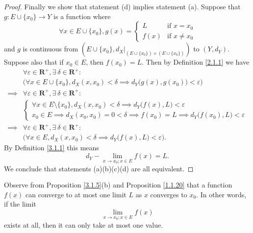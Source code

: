 \begin{proof}
    Finally we show that statement (d) implies statement (a).
    Suppose that \(g : E \cup \{x_0\} \to Y\) is a function where
    \[
        \forall x \in E \cup \{x_0\}, g(x) = \begin{cases}
            L    & \text{if } x = x_0    \\
            f(x) & \text{if } x \neq x_0
        \end{cases}
    \]
    and \(g\) is continuous from \((E \cup \{x_0\}, d_X|_{(E \cup \{x_0\}) \times (E \cup \{x_0\})})\) to \((Y, d_Y)\).
    Suppose also that if \(x_0 \in E\), then \(f(x_0) = L\).
    Then by Definition \ref{2.1.1} we have
    \begin{align*}
                 & \forall \varepsilon \in \mathbf{R}^+, \exists\ \delta \in \mathbf{R}^+ :                                       \\
                 & \Big(\forall x \in E \cup \{x_0\}, d_X(x, x_0) < \delta \implies d_Y\big(g(x), g(x_0)\big) < \varepsilon\Big)  \\
        \implies & \forall \varepsilon \in \mathbf{R}^+, \exists\ \delta \in \mathbf{R}^+ :                                       \\
                 & \begin{cases}
                       \forall x \in E \setminus \{x_0\}, d_X(x, x_0) < \delta \implies d_Y\big(f(x), L\big) < \varepsilon \\
                       x_0 \in E \implies d_X(x_0, x_0) = 0 < \delta \implies f(x_0) = L \implies d_Y\big(f(x_0), L\big) < \varepsilon
                   \end{cases} \\
        \implies & \forall \varepsilon \in \mathbf{R}^+, \exists\ \delta \in \mathbf{R}^+ :                                       \\
                 & \Big(\forall x \in E, d_X(x, x_0) < \delta \implies d_Y\big(f(x), L\big) < \varepsilon\Big).
    \end{align*}
    By Definition \ref{3.1.1} this means
    \[
        d_Y - \lim_{x \to x_0 ; x \in E} f(x) = L.
    \]
    We conclude that statements (a)(b)(c)(d) are all equivalent.
\end{proof}

\begin{remark}\label{3.1.6}
    Observe from Proposition \ref{3.1.5}(b) and Proposition \ref{1.1.20} that a function \(f(x)\) can converge to at most one limit \(L\) as \(x\) converges to \(x_0\).
    In other words, if the limit
    \[
        \lim_{x \to x_0 ; x \in E} f(x)
    \]
    exists at all, then it can only take at most one value.
\end{remark}

